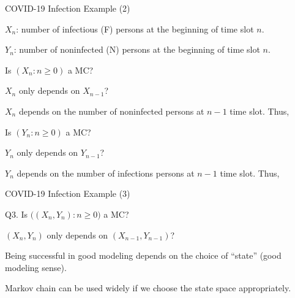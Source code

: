 \begin{frame}{COVID-19 Infection Example (2)}

\plitemsep 0.1in

\bce[Q1.] 

\item<1->[$\bullet$] $X_n$: number of infectious (F) persons at the beginning of time slot $n.$

\item<1->[$\bullet$] $Y_n$: number of noninfected (N) persons at the beginning of time slot $n.$




  
\item<2-> Is $(X_n: n \ge 0)$ a MC?
  \bci
  \item<3-> $X_n$ only depends on $X_{n-1}$? 
  \item<4-> $X_n$ depends on the number of noninfected persons at $n-1$
    time slot. Thus, 
    \eci

  \item<2-> Is $(Y_n: n \ge 0)$ a MC?
    \bci
\item<3-> $Y_n$ only depends on $Y_{n-1}$?
  \item<5-> $Y_n$ depends on the number of infections persons at $n-1$
    time slot. Thus, 
  \eci

    
  \ece
\end{frame}



\begin{frame}{COVID-19 Infection Example (3)}

\plitemsep 0.1in

\bci
\item[Q3.] Is $\Big((X_n,Y_n): n \ge 0 \Big)$ a MC?
  \bci
  \item $(X_n,Y_n)$ only depends on $(X_{n-1},Y_{n-1})$?
  \item<2-> 
    \eci

  \item<3-> 

\bci
\item<3->  Being successful in good modeling depends on
  the choice of ``state'' (good modeling sense). 
\item<4-> Markov chain can be used widely if we choose the state space
  appropriately. 

  \eci
  \eci
\end{frame}


